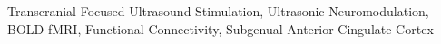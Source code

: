 \noindent Transcranial Focused Ultrasound Stimulation, Ultrasonic Neuromodulation, BOLD fMRI, Functional Connectivity, Subgenual Anterior Cingulate Cortex
